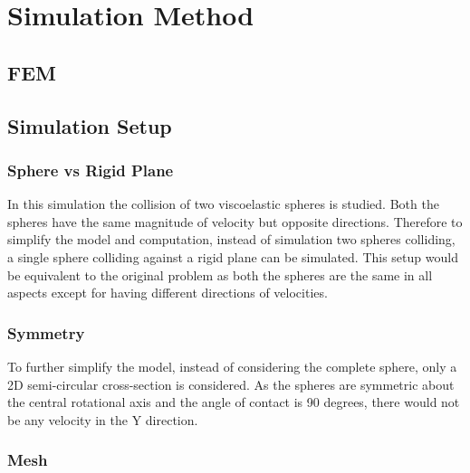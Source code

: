%
% 
% 


\chapter{Simulation Method}
\label{sec:Simulation Method}

\section{FEM}


\section{Simulation Setup}
\subsection{Sphere vs Rigid Plane}
In this simulation the collision of two viscoelastic spheres is studied. Both the spheres have the same magnitude of velocity but opposite directions. Therefore to simplify the model and computation, instead of simulation two spheres colliding, a single sphere colliding against a rigid plane can be simulated. This setup would be equivalent to the original problem as both the spheres are the same in all aspects except for having different directions of velocities.

\subsection{Symmetry}
To further simplify the model, instead of considering the complete sphere, only a 2D semi-circular cross-section is considered. As the spheres are symmetric about the central rotational axis and the angle of contact is 90 degrees, there would not be any velocity in the Y direction. 

\subsection{Mesh}

